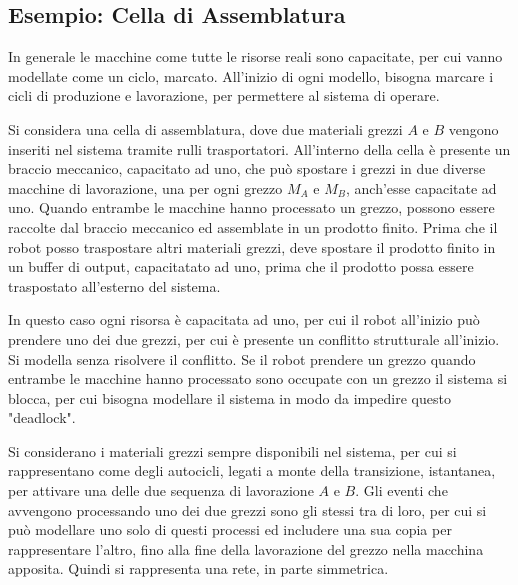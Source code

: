 \documentclass{article}
\numberwithin{equation}{subsection}
\begin{document}
\subsection{Esempio: Cella di Assemblatura}

In generale le macchine come tutte le risorse reali sono capacitate, per cui vanno modellate come un ciclo, marcato. All'inizio di ogni modello, bisogna marcare i cicli di 
produzione e lavorazione, per permettere al sistema di operare. 

Si considera una cella di assemblatura, dove due materiali grezzi $A$ e $B$ vengono inseriti nel sistema tramite rulli trasportatori. All'interno della cella è presente un 
braccio meccanico, capacitato ad uno, che può spostare i grezzi in due diverse macchine di lavorazione, una per ogni grezzo $M_A$ e $M_B$, anch'esse capacitate ad uno. 
Quando entrambe le macchine hanno processato un grezzo, possono essere raccolte dal braccio meccanico ed assemblate in un prodotto finito. Prima che il robot posso traspostare 
altri materiali grezzi, deve spostare il prodotto finito in un buffer di output, capacitatato ad uno, prima che il prodotto possa essere traspostato all'esterno del sistema. 

In questo caso ogni risorsa è capacitata ad uno, per cui il robot all'inizio può prendere uno dei due grezzi, per cui è presente un conflitto strutturale all'inizio. Si 
modella senza risolvere il conflitto. Se il robot prendere un grezzo quando entrambe le macchine hanno processato sono occupate con un grezzo il sistema si blocca, per cui 
bisogna modellare il sistema in modo da impedire questo "deadlock". 

Si considerano i materiali grezzi sempre disponibili nel sistema, per cui si rappresentano come degli autocicli, legati a monte della transizione, istantanea, per attivare 
una delle due sequenza di lavorazione $A$ e $B$. Gli eventi che avvengono processando uno dei due grezzi sono gli stessi tra di loro, per cui si può modellare uno solo di 
questi processi ed includere una sua copia per rappresentare l'altro, fino alla fine della lavorazione del grezzo nella macchina apposita. Quindi si rappresenta una 
rete, in parte simmetrica. 
\end{document}
